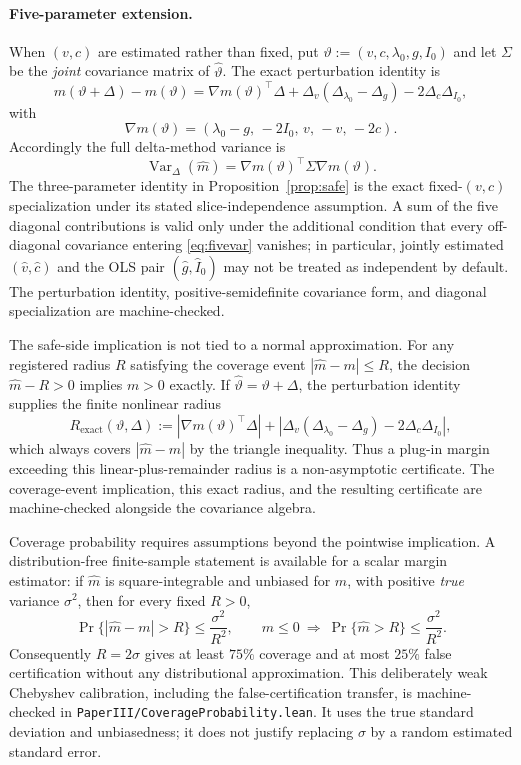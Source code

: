 \documentclass[11pt]{article}
\theoremstyle{definition}
\theoremstyle{remark}
\numberwithin{equation}{section}
\DeclareMathOperator{\Var}{Var}
\begin{document}
\paragraph{Five-parameter extension.}
When $(v,c)$ are estimated rather than fixed, put
$\vartheta:=(v,c,\lambda_0,g,I_0)$ and let $\Sigma$ be the \emph{joint}
covariance matrix of $\hat\vartheta$. The exact perturbation identity is
\[
m(\vartheta+\Delta)-m(\vartheta)
=
\nabla m(\vartheta)^\top\Delta
+\Delta_v(\Delta_{\lambda_0}-\Delta_g)-2\Delta_c\Delta_{I_0},
\]
with
\[
\nabla m(\vartheta)
=
(\lambda_0-g,\,-2I_0,\,v,\,-v,\,-2c).
\]
Accordingly the full delta-method variance is
\begin{equation}\label{eq:fivevar}
\Var_\Delta(\hat m)
=
\nabla m(\vartheta)^\top\Sigma\nabla m(\vartheta).
\end{equation}
The three-parameter identity in Proposition~\ref{prop:safe} is the exact
fixed-$(v,c)$ specialization under its stated slice-independence assumption.
A sum of the five diagonal contributions is valid only under the additional
condition that every off-diagonal covariance entering \eqref{eq:fivevar}
vanishes; in particular, jointly estimated $(\hat v,\hat c)$ and the OLS pair
$(\hat g,\hat I_0)$ may not be treated as independent by default. The
perturbation identity, positive-semidefinite covariance form, and diagonal
specialization are machine-checked.

The safe-side implication is not tied to a normal approximation. For any
registered radius $R$ satisfying the coverage event
$|\hat m-m|\le R$, the decision $\hat m-R>0$ implies $m>0$ exactly. If
$\hat\vartheta=\vartheta+\Delta$, the perturbation identity supplies the
finite nonlinear radius
\[
R_{\mathrm{exact}}(\vartheta,\Delta)
:=
|\nabla m(\vartheta)^\top\Delta|
+|\Delta_v(\Delta_{\lambda_0}-\Delta_g)-2\Delta_c\Delta_{I_0}|,
\]
which always covers $|\hat m-m|$ by the triangle inequality. Thus a plug-in
margin exceeding this linear-plus-remainder radius is a non-asymptotic
certificate. The coverage-event implication, this exact radius, and the
resulting certificate are machine-checked alongside the covariance algebra.

Coverage probability requires assumptions beyond the pointwise implication. A
distribution-free finite-sample statement is available for a scalar margin
estimator: if $\hat m$ is square-integrable and unbiased for $m$, with positive
\emph{true} variance $\sigma^2$, then for every fixed $R>0$,
\[
 \Pr\{|\hat m-m|>R\}\le \frac{\sigma^2}{R^2},\qquad
 m\le0\ \Longrightarrow\ \Pr\{\hat m>R\}\le\frac{\sigma^2}{R^2}.
\]
Consequently $R=2\sigma$ gives at least $75\%$ coverage and at most $25\%$
false certification without any distributional approximation. This deliberately
weak Chebyshev calibration, including the false-certification transfer, is
machine-checked in \texttt{PaperIII/CoverageProbability.lean}. It uses the
true standard deviation and unbiasedness; it does not justify replacing
$\sigma$ by a random estimated standard error.
\end{document}
